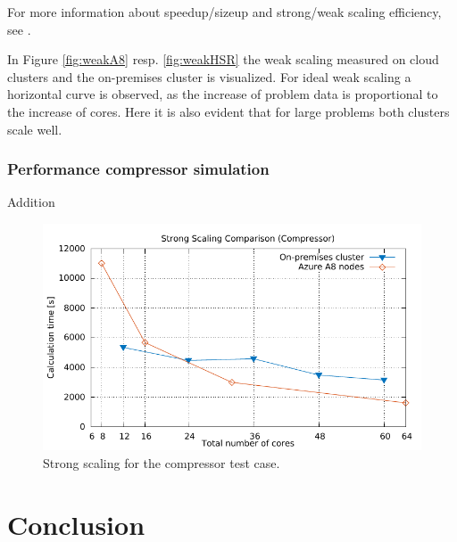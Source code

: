 \documentclass[3p,times]{elsarticle}
\begin{document}
For more information about speedup/sizeup and strong/weak scaling efficiency, see \cite{kaminsky15}.



In Figure \ref{fig:weakA8} resp. \ref{fig:weakHSR} the weak scaling measured on cloud clusters and the on-premises cluster is visualized. For ideal weak scaling a horizontal curve is observed, as the increase of problem data is proportional to the increase of cores. Here it is also evident that for large problems both clusters scale well. 




\subsubsection{Performance compressor simulation}
Addition

\begin{figure}
	\centering
	\includegraphics[width=0.5\linewidth]{gplt-compressor}
	\caption{Strong scaling for the compressor test case. }
	\label{fig:stringCompressor}
\end{figure}

 
\section{Conclusion}
\label{sec:conclusions}
\end{document}
